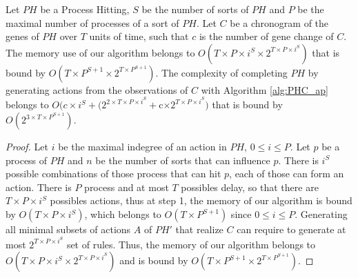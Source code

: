 \begin{theorem}[Complexity]
	\label{th:complexity}
	Let $PH$ be a Process Hitting, $S$ be the number of sorts of $PH$ and $P$ be the maximal number of processes of a sort of $PH$.
	Let $C$ be a chronogram of the genes of $PH$ over $T$ units of time, such that $c$ is the number of gene change of $C$.
	The memory use of our algorithm belongs to $O(T \times  P \times  i^S \times  2^{T\times  P \times  i^S})$ that is bound by $O(T \times  P^{S+1} \times  2^{T\times  P^{S+1}})$.
	The complexity of completing $PH$ by generating actions from the observations of $C$ with Algorithm \ref{alg:PHC_ap} belongs to
	$O(c\times i^S + (2^{2\times T\times  P \times  i^S} + $c$ \times  2^{T\times  P \times  i^S})$ that is bound by $O(2^{3\times T\times P^{S+1}})$.
	\begin{proof}
		Let $i$ be the maximal indegree of an action in $PH$, $0 \leq i \leq P$.
		Let $p$ be a process of $PH$ and $n$ be the number of sorts that can influence $p$.
		There is $i^S$ possible combinations of those process that can hit $p$, each of those can form an action.
		There is $P$ process and at most $T$ possibles delay, so that there are $T\times  P \times  i^S$ possibles actions,
		thus at step 1, the memory of our algorithm is bound by $O(T \times  P \times  i^S)$,
		which belongs to $O(T\times P^{S+1})$ since $0 \leq i \leq P$.
		Generating all minimal subsets of actions $A$ of $PH'$ that realize $C$ can require to generate at most $2^{T\times  P \times  i^S}$ set of rules.
		Thus, the memory of our algorithm belongs to $O(T \times  P \times  i^S \times  2^{T\times  P \times  i^S})$ and is bound by $O(T \times  P^{S+1} \times  2^{T\times  P^{S+1}})$.
		

\end{proof}
\end{theorem}
